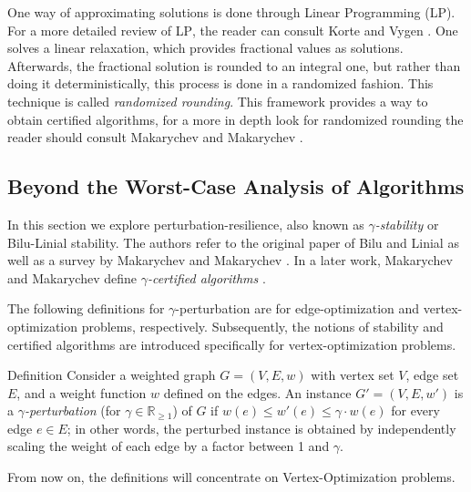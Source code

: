 One way of approximating solutions is done through Linear Programming (LP). For a more detailed review of \textsc{LP}, 
the reader can consult Korte and Vygen \cite[Chapter 3]{Korte2007CombinatorialOT}.
One solves a linear relaxation, 
which provides fractional values as solutions. Afterwards, the fractional solution 
is rounded to an integral one, but rather than doing it 
deterministically, this process is done in a randomized fashion.
This technique is called \textit{randomized rounding}.
This framework provides a way to obtain certified algorithms, for a more in depth look 
for randomized rounding the reader should consult Makarychev and Makarychev \cite{Makarychev_Makarychev_2021}. 

\subsection{Beyond the Worst-Case Analysis of Algorithms}\label{BWCA-section}

In this section we explore perturbation-resilience, also known as \textit{$\gamma$-stability} or Bilu-Linial stability. 
The authors refer to the original paper of Bilu and Linial \cite{bilu2012stable} as well as a survey 
by Makarychev and Makarychev \cite{makarychev2016bilu}. In a later work, Makarychev and Makarychev define 
\textit{$\gamma$-certified algorithms} \cite{Makarychev_Makarychev_2021}.

The following definitions for $\gamma$-perturbation are for edge-optimization 
and vertex-optimization problems, respectively. 
Subsequently, the notions of stability and certified algorithms are introduced 
specifically for vertex-optimization problems.

\begin{mydefinition}{Definition}
Consider a weighted graph \( G = (V, E, w) \) with vertex set \( V \), 
edge set \( E \), and a weight function \( w \) defined on the edges. 
An instance \( G' = (V, E, w') \) is a \emph{$\gamma$-perturbation} 
(for \( \gamma \in \mathbb{R}_{\ge 1} \)) of 
\( G \) if \( w(e) \le w'(e) \le \gamma \cdot w(e) \) for every edge 
\( e \in E \); in other words, the perturbed instance is obtained by independently 
scaling the weight of each edge by a factor between 1 and \( \gamma \).
\end{mydefinition}

From now on, the definitions will concentrate on Vertex-Optimization problems.

